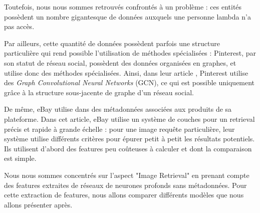 Toutefois, nous nous sommes retrouvés confrontés à un problème : ces entités possèdent un nombre gigantesque de données
auxquels une personne lambda n'a pas accès. 

Par ailleurs, cette quantité de données possèdent parfois une structure particulière qui rend possible l'utilisation de
méthodes spécialisées : Pinterest, par son statut de réseau social, possèdent des données organisées en graphes, et
utilise donc des méthodes spécialisées. Ainsi, dans leur article \cite{ying2018graph}, Pinterest utilise des
\textit{Graph Convolutional Neural Networks} (GCN), ce qui est possible uniquement grâce à la structure sous-jacente de
graphe d'un réseau social.

De même, eBay utilise dans \cite{yang2017visual} des métadonnées associées aux produits de sa plateforme. Dans cet
article, eBay utilise un système de couches pour un retrieval précis et rapide à grande échelle : pour une image requête
particulière, leur système utilise différents critères pour épurer petit à petit les résultats potentiels. Ils utilisent
d'abord des features peu coûteuses à calculer et dont la comparaison est simple.

Nous nous sommes concentrés sur l'aspect "Image Retrieval" en prenant compte des features extraites de réseaux de
neurones profonds sans métadonnées. Pour cette extraction de features, nous allons comparer différents modèles que nous
allons présenter après.
